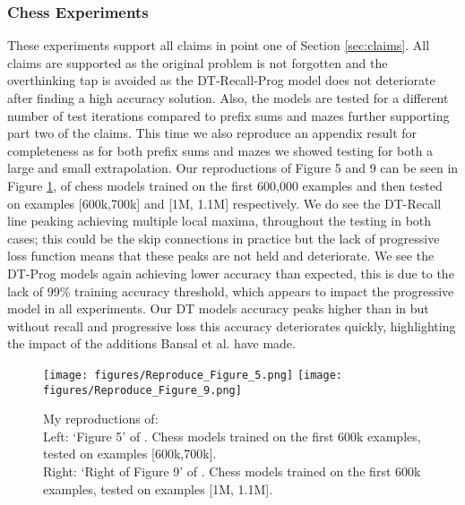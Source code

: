 \subsubsection{Chess Experiments}
These experiments support all claims in point one of Section \ref{sec:claims}. All claims are supported as the original problem is not forgotten and the overthinking tap is avoided as the DT-Recall-Prog model does not deteriorate after finding a high accuracy solution. Also, the models are tested for a different number of test iterations compared to prefix sums and mazes further supporting part two of the claims. This time we also reproduce an appendix result for completeness as for both prefix sums and mazes we showed testing for both a large and small extrapolation. Our reproductions of Figure 5 and 9 can be seen in Figure \ref{figs:chess}, of chess models trained on the first 600,000 examples and then tested on examples [600k,700k] and [1M, 1.1M] respectively. We do see the DT-Recall line peaking achieving multiple local maxima, throughout the testing in both cases; this could be the skip connections in practice but the lack of progressive loss function means that these peaks are not held and deteriorate. We see the DT-Prog models again achieving lower accuracy than expected, this is due to the lack of 99\% training accuracy threshold, which appears to impact the progressive model in all experiments. Our DT models accuracy peaks higher than in \cite{bansal2022endtoend} but without recall and progressive loss this accuracy deteriorates quickly, highlighting the impact of the additions Bansal et al. have made.
\begin{figure}[h]
    \texttt{[image: figures/Reproduce\_Figure\_5.png]}\hfill
    \texttt{[image: figures/Reproduce\_Figure\_9.png]}
    \\[\smallskipamount]
    \caption{My reproductions of:\\
    Left: `Figure 5' of \cite{bansal2022endtoend}. Chess models trained on the first 600k examples, tested on examples [600k,700k].\\
    Right: `Right of Figure 9' of \cite{bansal2022endtoend}. Chess models trained on the first 600k examples, tested on examples [1M, 1.1M].}
    \label{figs:chess}
\end{figure}
